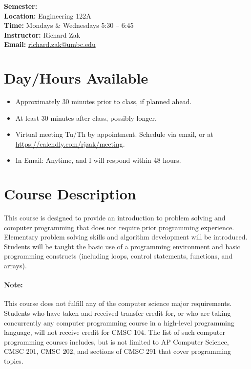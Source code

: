 \documentclass[letter,10pt]{article}
\begin{document}
\textbf{Semester:} \\
\textbf{Location:} Engineering 122A \\
\textbf{Time:} Mondays \& Wednesdays 5:30 -- 6:45 \\
\textbf{Instructor:} Richard Zak \\
\textbf{Email:} \href{mailto:richard.zak@umbc.edu?Subject=CMSC104}{richard.zak@umbc.edu}

\section*{Day/Hours Available}
\begin{itemize}
\item Approximately 30 minutes prior to class, if planned ahead.
\item At least 30 minutes after class, possibly longer.
\item Virtual meeting Tu/Th by appointment. Schedule via email, or at \url{https://calendly.com/rjzak/meeting}.
\item In Email: Anytime, and I will respond within 48 hours.
\end{itemize}

\section*{Course Description}
\paragraph{}This course is designed to provide an introduction to problem solving and computer programming that does not require prior programming experience. Elementary problem solving skills and algorithm development will be introduced. Students will be taught the basic use of a programming environment and basic programming constructs (including loops, control statements, functions, and arrays).

\paragraph{Note:}This course does not fulfill any of the computer science major requirements. Students who have taken and received transfer credit for, or who are taking concurrently any computer programming course in a high-level programming language, will not receive credit for CMSC 104. The list of such computer programming courses includes, but is not limited to AP Computer Science, CMSC 201, CMSC 202, and sections of CMSC 291 that cover programming topics.
\end{document}
